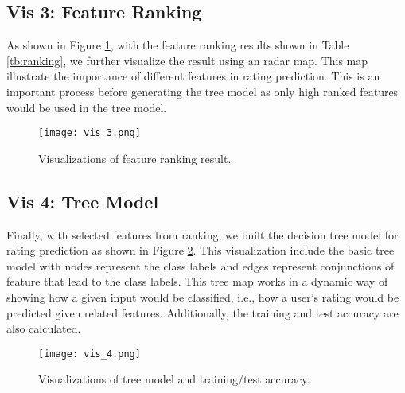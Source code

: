 \subsection{Vis 3: Feature Ranking}

As shown in Figure \ref{fig:vis_3}, with the feature ranking results shown in Table \ref{tb:ranking}, we further visualize the result using an radar map. This map illustrate the importance of different features in rating prediction. This is an important process before generating the tree model as only high ranked features would be used in the tree model. 

\begin{figure}[h]
	\centering
	\texttt{[image: vis\_3.png]}
	\caption{Visualizations of feature ranking result.}
	\label{fig:vis_3}
\end{figure}

\subsection{Vis 4: Tree Model}

Finally, with selected features from ranking, we built the decision tree model for rating prediction as shown in Figure \ref{fig:vis_4}. This visualization include the basic tree model with nodes represent the class labels and edges represent conjunctions of feature that lead to the class labels. This tree map works in a dynamic way of showing how a given input would be classified, i.e., how a user's rating would be predicted given related features. Additionally, the training and test accuracy are also calculated. 

\begin{figure}[h]
	\centering
	\texttt{[image: vis\_4.png]}
	\caption{Visualizations of tree model and training/test accuracy.}
	\label{fig:vis_4}
\end{figure}
